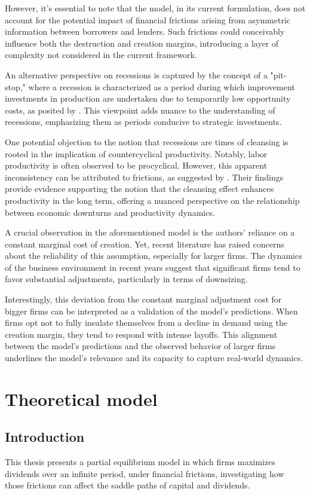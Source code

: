 \documentclass[12pt]{article}
\begin{document}
However, it's essential to note that the model, in its current formulation, does not account for the potential impact of
financial frictions arising from asymmetric information between borrowers and lenders. Such frictions could conceivably
influence both the destruction and creation margins, introducing a layer of complexity not considered in the current
framework. 

An alternative perspective on recessions is captured by the concept of a "pit-stop," where a recession is characterized
as a period during which improvement investments in production are undertaken due to temporarily low opportunity costs,
as posited by \cite{DAvHalt90}. This viewpoint adds nuance to the understanding of recessions, emphasizing them as
periods conducive to strategic investments. 

One potential objection to the notion that recessions are times of cleansing is rooted in the implication of
countercyclical productivity. Notably, labor productivity is often observed to be procyclical. However, this apparent
inconsistency can be attributed to frictions, as suggested by \cite{GaHam92}. Their findings provide evidence supporting
the notion that the cleansing effect enhances productivity in the long term, offering a nuanced perspective on the
relationship between economic downturns and productivity dynamics. 
\par
A crucial observation in the aforementioned model is the authors' reliance on a constant marginal cost of creation. Yet,
recent literature has raised concerns about the reliability of this assumption, especially for larger firms. The
dynamics of the business environment in recent years suggest that significant firms tend to favor substantial
adjustments, particularly in terms of downsizing. 
\par
Interestingly, this deviation from the constant marginal adjustment cost for bigger firms can be interpreted as a
validation of the model's predictions. When firms opt not to fully insulate themselves from a decline in demand using
the creation margin, they tend to respond with intense layoffs. This alignment between the model's predictions and the
observed behavior of larger firms underlines the model's relevance and its capacity to capture real-world dynamics. 

\section{Theoretical model}
\subsection{Introduction}
This thesis presents a partial equilibrium model in which firms maximizes dividends over an infinite period, under financial frictions,
investigating how those frictions can affect the saddle paths of capital and dividends.
\end{document}
